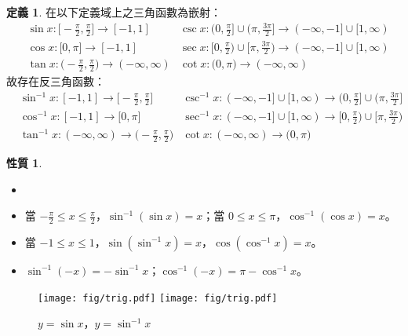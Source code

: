 \documentclass[12pt]{extarticle}
\newcommand{\ds}{\displaystyle}
\theoremstyle{definition}
\newtheorem*{dfn}{定義}
\newtheorem*{prp}{性質}
\begin{document}
\begin{dfn}
  在以下定義域上之三角函數為嵌射：
  \begin{align*}
    &\sin x: \big[-\frac{\pi}{2}, \frac{\pi}{2}\big]\to[-1, 1] &\csc x: \big(0, \frac{\pi}{2}\big]\cup\big(\pi, \frac{3\pi}{2}\big]\to(-\infty, -1]\cup[1,\infty) \\
    &\cos x: \big[0, \pi\big]\to[-1, 1] &\sec x: \big[0, \frac{\pi}{2}\big)\cup\big[\pi, \frac{3\pi}{2}\big)\to(-\infty, -1]\cup[1,\infty) \\
    &\tan x: \big(-\frac{\pi}{2}, \frac{\pi}{2}\big)\to(-\infty, \infty) &\cot x: \big(0, \pi\big)\to(-\infty, \infty)\qquad\qquad
  \end{align*}
  故存在反三角函數：
  \begin{align*}
   &\sin^{-1} x: [-1, 1]\to\big[-\frac{\pi}{2}, \frac{\pi}{2}\big] &\csc^{-1} x: (-\infty, -1]\cup[1,\infty)\to\big(0, \frac{\pi}{2}\big]\cup\big(\pi, \frac{3\pi}{2}\big] \\
   &\cos^{-1} x: [-1, 1]\to\big[0, \pi\big] &\sec^{-1} x: (-\infty, -1]\cup[1,\infty)\to\big[0, \frac{\pi}{2}\big)\cup\big[\pi, \frac{3\pi}{2}\big) \\
   &\tan^{-1} x: (-\infty, \infty)\to\big(-\frac{\pi}{2}, \frac{\pi}{2}\big) &\cot x: (-\infty, \infty)\to\big(0, \pi\big)\qquad\qquad
 \end{align*}
\end{dfn}

\begin{prp}
  \begin{itemize}\setlength\itemsep{0em}
    \item[]
    \item 當 $\ds-\frac{\pi}{2}\leqslant x\leqslant\frac{\pi}{2}$，$\sin^{-1}(\sin x) = x$；當 $\ds 0\leqslant x\leqslant\pi$，$\cos^{-1}(\cos x) = x$。
    \item 當 $\ds-1\leqslant x\leqslant1$，$\sin(\sin^{-1} x) = x$，$\cos(\cos^{-1} x) = x$。
    \item $\sin^{-1}(-x) = -\sin^{-1}x$；$\cos^{-1}(-x) = \pi - \cos^{-1}x$。
  \end{itemize}
\end{prp}

\vspace{-1cm}
\begin{figure}[!htbp]
  \centering
  \texttt{[image: fig/trig.pdf]}
  \texttt{[image: fig/trig.pdf]}
  \caption{$y = \sin x$，$y = \sin^{-1} x$}
\end{figure}
\end{document}
